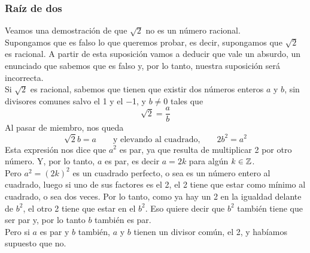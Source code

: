 \documentclass[../Teoría.root.tex]{subfiles}
\begin{document}
        \subsubsection{Raíz de dos}
        Veamos una demostración de que \(\sqrt{2}\) no es un número racional.\\
        Supongamos que es falso lo que queremos probar, es decir, supongamos que \(\sqrt{2}\) es racional. A partir de esta suposición vamos a deducir que vale un absurdo, un enunciado que sabemos que es falso y, por lo tanto, nuestra suposición será incorrecta.\\
        Si \(\sqrt{2}\) es racional, sabemos que tienen que existir dos números enteros \(a\) y \(b\), sin divisores comunes salvo el 1 y el −1, y \(b \neq 0\) tales que \[\sqrt{2}=\frac{a}{b}\] Al pasar de miembro, nos queda
        \[\sqrt{2}b=a\qquad\text{y elevando al cuadrado,}\qquad 2b^2=a^2\]
        Esta expresión nos dice que \(a^2\) es par, ya que resulta de multiplicar 2 por otro número. Y, por lo tanto, \(a\) es par, es decir \(a = 2k\) para algún \(k \in \mathbb{Z}\).\\
        Pero \(a^2 = (2k)^2\) es un cuadrado perfecto, o sea es un número entero al cuadrado, luego si uno de sus factores es el 2, el 2 tiene que estar como mínimo al cuadrado, o sea dos veces. Por lo tanto, como ya hay un 2 en la igualdad delante de \(b^2\), el otro 2 tiene que estar en el \(b^2\). Eso quiere decir que \(b^2\) también tiene que ser par y, por lo tanto \(b\) también es par.\\
        Pero si \(a\) es par y \(b\) también, \(a\) y \(b\) tienen un divisor común, el 2, y habíamos supuesto que no.
\end{document}
